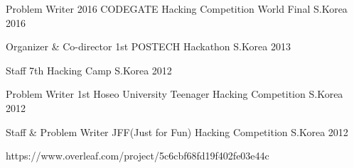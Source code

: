 

\begin{cvhonors}

  \cvhonor
    {Problem Writer} %
    {2016 CODEGATE Hacking Competition World Final} %
    {S.Korea} %
    {2016} %

  \cvhonor
    {Organizer \& Co-director} %
    {1st POSTECH Hackathon} %
    {S.Korea} %
    {2013} %

  \cvhonor
    {Staff} %
    {7th Hacking Camp} %
    {S.Korea} %
    {2012} %

  \cvhonor
    {Problem Writer} %
    {1st Hoseo University Teenager Hacking Competition} %
    {S.Korea} %
    {2012} %

  \cvhonor
    {Staff \& Problem Writer} %
    {JFF(Just for Fun) Hacking Competition} %
    {S.Korea} %
    {2012} %

\end{cvhonors}
https://www.overleaf.com/project/5c6cbf68fd19f402fe03e44c